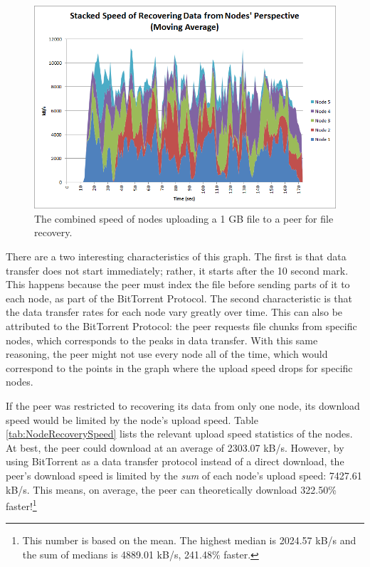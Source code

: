\documentclass[12pt]{report}
\begin{document}
\begin{figure}
  \centerline{\includegraphics[scale=1]{figures/NodeRecoverySpeed}}
  \caption{The combined speed of nodes uploading a 1 GB file to a peer for file recovery.
  \label{fig:NodeRecoverySpeed}}
\end{figure}

There are a two interesting characteristics of this graph. The first is that data transfer does not start immediately; rather, it starts after the 10 second mark. This happens because the peer must index the file before sending parts of it to each node, as part of the BitTorrent Protocol. The second characteristic is that the data transfer rates for each node vary greatly over time. This can also be attributed to the BitTorrent Protocol: the peer requests file chunks from specific nodes, which corresponds to the peaks in data transfer. With this same reasoning, the peer might not use every node all of the time, which would correspond to the points in the graph where the upload speed drops for specific nodes.

If the peer was restricted to recovering its data from only one node, its download speed would be limited by the node's upload speed. Table \ref{tab:NodeRecoverySpeed} lists the relevant upload speed statistics of the nodes. At best, the peer could download at an average of 2303.07 kB/s. However, by using BitTorrent as a data transfer protocol instead of a direct download, the peer's download speed is limited by the \textit{sum} of each node's upload speed: 7427.61 kB/s. This means, on average, the peer can theoretically download 322.50\% faster!\footnote{This number is based on the mean. The highest median is 2024.57 kB/s and the sum of medians is 4889.01 kB/s, 241.48\% faster.}
\end{document}
